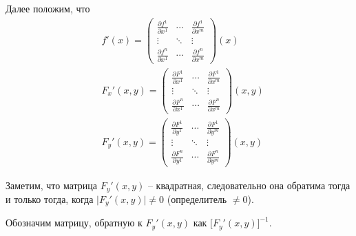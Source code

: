 \begin{note}
    Далее положим, что
    \begin{align*}
         & f'(x) = \left(\begin{matrix}
                             \frac{\partial f^1}{\partial x^1} & \cdots & \frac{\partial f^1}{\partial x^m} \\
                             \vdots                        & \ddots & \vdots                        \\
                             \frac{\partial f^n}{\partial x^1} & \cdots & \frac{\partial f^n}{\partial x^m}
                         \end{matrix}\right) (x)     \\
         & F_x'(x,y) = \left(\begin{matrix}
                                 \frac{\partial F^1}{\partial x^1} & \cdots & \frac{\partial F^1}{\partial x^m} \\
                                 \vdots                        & \ddots & \vdots                        \\
                                 \frac{\partial F^n}{\partial x^1} & \cdots & \frac{\partial F^n}{\partial x^m}
                             \end{matrix}\right) (x,y) \\
         & F_y'(x,y) = \left(\begin{matrix}
                                 \frac{\partial F^1}{\partial y^1} & \cdots & \frac{\partial F^1}{\partial y^m} \\
                                 \vdots                        & \ddots & \vdots                        \\
                                 \frac{\partial F^n}{\partial y^1} & \cdots & \frac{\partial F^n}{\partial y^m}
                             \end{matrix}\right) (x,y)
    \end{align*}

    Заметим, что матрица $ F_y'(x,y) $ -- квадратная, следовательно она обратима тогда и только тогда, когда $ \big|F_y'(x,y)\big| \ne 0 $ (определитель $ \ne 0 $).

    Обозначим матрицу, обратную к $ F_y'(x,y) $ как $ \big[F_y'(x,y)\big]^{-1} $.
\end{note}

